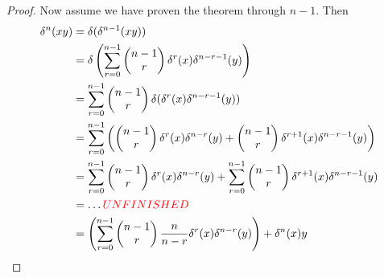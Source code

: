 \documentclass[12pt]{article}
\theoremstyle{definition}
\begin{document}
\begin{proof}
	Now assume we have proven the theorem through $n - 1$.
	Then \begin{align*}
		\delta^n(xy) & = \delta(\delta^{n-1}(xy))                                                                                                                                                 \\
		             & = \delta\left( \sum_{r=0}^{n-1}\begin{pmatrix}n-1 \\ r\end{pmatrix} \delta^r(x)\delta^{n-r - 1}(y) \right)                                                                 \\
		             & = \sum_{r=0}^{n-1}\begin{pmatrix}n-1 \\ r\end{pmatrix} \delta(\delta^r(x)\delta^{n-r - 1}(y))                                                                              \\
		             & = \sum_{r=0}^{n-1}\left(\begin{pmatrix}n-1 \\ r\end{pmatrix} \delta^r(x)\delta^{n-r}(y) + \begin{pmatrix}n-1 \\ r\end{pmatrix}\delta^{r+1}(x)\delta^{n-r - 1}(y)\right)    \\
		             & = \sum_{r=0}^{n-1}\begin{pmatrix}n-1 \\ r\end{pmatrix} \delta^r(x)\delta^{n-r}(y) + \sum_{r=0}^{n-1}\begin{pmatrix}n-1 \\ r\end{pmatrix}\delta^{r+1}(x)\delta^{n-r - 1}(y) \\
		             & = \dots \textcolor{red}{UNFINISHED}                                                                                                                                                                    \\
		             & = \left(\sum_{r=0}^{n-1}\begin{pmatrix}n-1 \\ r\end{pmatrix}\frac{n}{n-r} \delta^r(x)\delta^{n-r}(y)\right) + \delta^n(x)y                                                 \\

\end{align*}
\end{proof}
\end{document}
